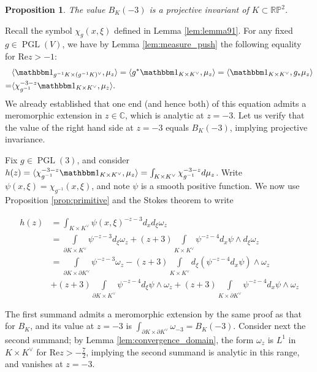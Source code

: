\documentclass[reqno,10pt]{amsart}
\newcounter{mp}
\newtheorem{Proposition}{Proposition}[section]
\renewcommand{\Re}{\mathrm {Re}}
\DeclareMathOperator{\PGL}{PGL}
\newcommand{\R}{\mathbb{R}}
\newcommand{\PP}{\mathbb{P}}
\begin{document}
\begin{Proposition}
	The value $B_K(-3)$ is a projective invariant of $K\subset\R\PP^2$.
\end{Proposition}
\proof
Recall the symbol $\chi_g(x,\xi)$ defined in Lemma \ref{lem:lemma91}. For any fixed $g\in \PGL(V)$, we have by Lemma \ref{lem:measure_push} the following equality for $\textrm{Re}z>-1$:
\begin{align}\label{eq:invariance}&\langle \mathbbm 1_{g^{-1}K\times (g^{-1}K)^\vee}, \mu_z\rangle=\langle g^*\mathbbm1_{K\times K^\vee},\mu_z\rangle=\langle \mathbbm1_{K\times K^\vee}, g_*\mu_z\rangle\\=&\langle \chi_{g^{-1}}^{-3-z}\mathbbm 1_{K\times K^\vee}, \mu_z\rangle.\nonumber\end{align}
We already established that one end (and hence both) of this equation admits a meromorphic extension in $z\in \mathbb C$, which is analytic at $z=-3$. Let us verify that the value of the right hand side at $z=-3$ equals $B_K(-3)$, implying projective invariance.

 Fix $g\in \PGL(3)$, and consider $h(z)=\langle \chi_{g^{-1}}^{-3-z} \mathbbm 1_{K\times K^\vee}, \mu_z\rangle=\int_{K\times K^\vee} \chi_{g^{-1}}^{-3-z} d\mu_z$. Write $\psi(x,\xi)=\chi_{g^{-1}}(x,\xi)$, and note $\psi$ is a smooth positive function. We now use Proposition \ref{prop:primitive} and the Stokes theorem to write 

\begin{align*}h(z)&= \int_{K\times K^\vee} \psi(x,\xi)^{-z-3}d_xd_\xi\omega_z\\&=\int\limits_{\partial K\times K^\vee}\psi^{-z-3}d_\xi\omega_z+(z+3)\int\limits_{K\times K^\vee}\psi^{-z-4} d_x \psi\wedge d_\xi \omega_z 
	\\ &=\int\limits_{\partial K\times \partial K^\vee}\psi^{-z-3}\omega_z- (z+3)\int\limits_{K\times K^\vee} d_\xi(\psi^{-z-4}d_x \psi)\wedge\omega_z \\ &+(z+3)\int\limits_{\partial K\times K^\vee}\psi^{-z-4}d_\xi \psi\wedge\omega_z +(z+3)\int\limits_{ K\times \partial K^\vee}\psi^{-z-4}  d_x \psi\wedge \omega_z\end{align*}

The first summand admits a meromorphic extension by the same proof as that for $B_K$, and its value at $z=-3$ is  $\int_{\partial K\times \partial K^\vee}\omega_{-3}=B_K(-3)$. Consider next the second summand; by Lemma \ref{lem:convergence_domain}, the form $\omega_z$ is $L^1$ in $K\times K^\vee$ for $\Re z>-\frac72$, implying the second summand is analytic in this range, and vanishes at $z=-3$. 
\end{document}
